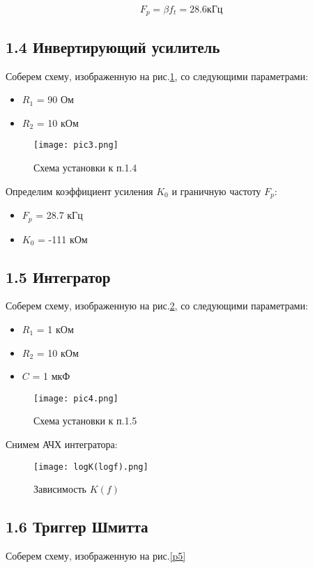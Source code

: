 \documentclass[a4paper,12pt]{report}
\begin{document}
\begin{equation*}
    F_{p} = \beta f_{t} = 28.6  \text{кГц}
\end{equation*}

\subsection*{1.4 Инвертирующий усилитель}

Соберем схему, изображенную на рис.\ref{p3}, со следующими параметрами:
\begin{itemize}
    \item $R_{1}$ = 90 Ом
    \item $R_{2}$ = 10 кОм
\end{itemize}

\begin{figure}[H]
    \texttt{[image: pic3.png]}
    \caption{Схема установки к п.1.4}
    \label{p3}
\end{figure}

Определим коэффициент усиления $K_{0}$ и граничную частоту $F_{p}$:
\begin{itemize}
    \item $F_{p}$ = 28.7 кГц
    \item $K_{0}$ = -111 кОм
\end{itemize}

\subsection*{1.5 Интегратор}
Соберем схему, изображенную на рис.\ref{p4}, со следующими параметрами:
\begin{itemize}
    \item $R_{1}$ = 1 кОм
    \item $R_{2}$ = 10 кОм
    \item $C$ = 1 мкФ
\end{itemize}

\begin{figure}[H]
    \texttt{[image: pic4.png]}
    \caption{Схема установки к п.1.5}
    \label{p4}
\end{figure}

Снимем АЧХ интегратора:

\begin{figure}[H]
    \texttt{[image: logK(logf).png]}
    \caption{Зависимость $K(f)$}
    \label{logK(logf)}
\end{figure}

\subsection*{1.6 Триггер Шмитта}
Соберем схему, изображенную на рис.\ref{p5}
\end{document}
